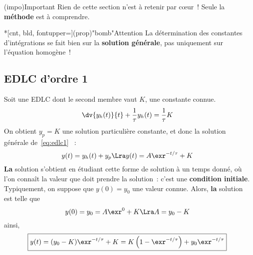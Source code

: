 \documentclass[a4paper, 12pt, garamond]{book}
\begin{document}
\begin{tcb}[cnt](impo){Important}
	Rien de cette section n'est à retenir par cœur~! Seule la \textbf{méthode} est
	à comprendre.
\end{tcb}
\begin{tcb}*[cnt, bld, fontupper=\Large](prop)"bomb"{Attention}
	La détermination des constantes d'intégrations se fait bien sur la
	\textbf{solution générale}, pas uniquement sur l'équation homogène~!
\end{tcb}

\subsection{EDLC d'ordre 1}
Soit une EDLC dont le second membre vaut $K$, une constante connue.
\begin{equation}
	\dv{y_h(t)}{t} + \frac{1}{\tau} y_h(t) = \frac{1}{\tau}K
	\label{eq:edlc1}
\end{equation}
On obtient $y_p = K$ une solution particulière constante, et donc la solution
générale de~\eqref{eq:edlc1} ~:
\[
	y(t) = y_h(t) + y_p
	\Lra
	y(t) = A\exr^{-t/\tau} + K
\]
\textbf{La} solution s'obtient en étudiant cette forme de solution à un temps
donné, où l'on connaît la valeur que doit prendre la solution~: c'est une
\textbf{condition initiale}. Typiquement, on suppose que $y(0) = y_0$ une valeur
connue. Alors, \textbf{la} solution est telle que
\[
	y(0) = y_0 = A\exr^{0} + K
	\Lra
	A = y_0 - K
\]
ainsi,
\[
	\boxed{
		y(t) =
		(y_0-K)\exr^{-t/\tau}+K =
		K\left(1-\exr^{-t/\tau}\right)+y_0 \exr^{-t/\tau}}
\]
\end{document}
